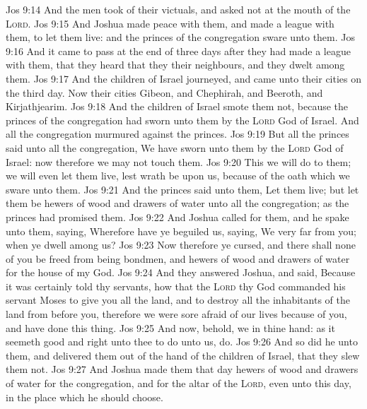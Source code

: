 \vs Jos 9:14 And the men took of their victuals, and asked not  at the mouth of the \textsc{Lord}.
\vs Jos 9:15 And Joshua made peace with them, and made a league with them, to let them live: and the princes of the congregation sware unto them.
\vs Jos 9:16 And it came to pass at the end of three days after they had made a league with them, that they heard that they  their neighbours, and  they dwelt among them.
\vs Jos 9:17 And the children of Israel journeyed, and came unto their cities on the third day. Now their cities  Gibeon, and Chephirah, and Beeroth, and Kirjathjearim.
\vs Jos 9:18 And the children of Israel smote them not, because the princes of the congregation had sworn unto them by the \textsc{Lord} God of Israel. And all the congregation murmured against the princes.
\vs Jos 9:19 But all the princes said unto all the congregation, We have sworn unto them by the \textsc{Lord} God of Israel: now therefore we may not touch them.
\vs Jos 9:20 This we will do to them; we will even let them live, lest wrath be upon us, because of the oath which we sware unto them.
\vs Jos 9:21 And the princes said unto them, Let them live; but let them be hewers of wood and drawers of water unto all the congregation; as the princes had promised them.
\vs Jos 9:22 And Joshua called for them, and he spake unto them, saying, Wherefore have ye beguiled us, saying, We  very far from you; when ye dwell among us?
\vs Jos 9:23 Now therefore ye  cursed, and there shall none of you be freed from being bondmen, and hewers of wood and drawers of water for the house of my God.
\vs Jos 9:24 And they answered Joshua, and said, Because it was certainly told thy servants, how that the \textsc{Lord} thy God commanded his servant Moses to give you all the land, and to destroy all the inhabitants of the land from before you, therefore we were sore afraid of our lives because of you, and have done this thing.
\vs Jos 9:25 And now, behold, we  in thine hand: as it seemeth good and right unto thee to do unto us, do.
\vs Jos 9:26 And so did he unto them, and delivered them out of the hand of the children of Israel, that they slew them not.
\vs Jos 9:27 And Joshua made them that day hewers of wood and drawers of water for the congregation, and for the altar of the \textsc{Lord}, even unto this day, in the place which he should choose.

